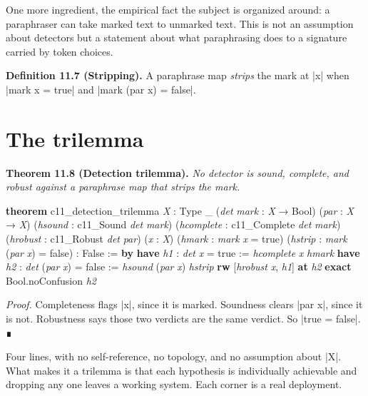 \documentclass{memoir}
\begin{document}
One more ingredient, the empirical fact the subject is organized around: a
paraphraser can take marked text to unmarked text. This is not an assumption
about detectors but a statement about what paraphrasing does to a signature
carried by token choices.

\textbf{Definition 11.7 (Stripping).} A paraphrase map \emph{strips} the mark at
\LeanVerb|x| when \LeanVerb|mark x = true| and \LeanVerb|mark (par x) = false|.



\section{The trilemma}\label{Two--Schemas--of--Impossibility-005F-005F-005F--Machine--Checked--Limits--of--Trustworthy--Machine--Learning-005F-005F-005F--and--Why--They--Tighten--with--Capability----Watermarks-005F-005F-005F--Paraphrase-005F-005F-005F--and--the--Third--Corner----The--trilemma}

\textbf{Theorem 11.8 (Detection trilemma).} \emph{No detector is sound, complete, and
robust against a paraphrase map that strips the mark.}

\begin{LeanVerbatim}
\textbf{theorem} c11_detection_trilemma \textit{X} : Type _
    (\textit{det} \textit{mark} : \textit{X} → Bool) (\textit{par} : \textit{X} → \textit{X})
    (\textit{hsound} : c11_Sound \textit{det} \textit{mark})
    (\textit{hcomplete} : c11_Complete \textit{det} \textit{mark})
    (\textit{hrobust} : c11_Robust \textit{det} \textit{par})
    (\textit{x} : \textit{X}) (\textit{hmark} : \textit{mark} \textit{x} = true)
    (\textit{hstrip} : \textit{mark} (\textit{par} \textit{x}) = false) :
    False := \textbf{by}
  \textbf{have} \textit{h1} : \textit{det} \textit{x} = true := \textit{hcomplete} \textit{x} \textit{hmark}
  \textbf{have} \textit{h2} : \textit{det} (\textit{par} \textit{x}) = false := \textit{hsound} (\textit{par} \textit{x}) \textit{hstrip}
  \textbf{rw} [\textit{hrobust} \textit{x}, \textit{h1}] \textbf{at} \textit{h2}
  \textbf{exact} Bool.noConfusion \textit{h2}

\end{LeanVerbatim}


\emph{Proof.} Completeness flags \LeanVerb|x|, since it is marked. Soundness clears \LeanVerb|par x|,
since it is not. Robustness says those two verdicts are the same verdict. So
\LeanVerb|true = false|. ∎

Four lines, with no self-reference, no topology, and no assumption about \LeanVerb|X|.
What makes it a trilemma is that each hypothesis is individually achievable and
dropping any one leaves a working system. Each corner is a real deployment.
\end{document}
